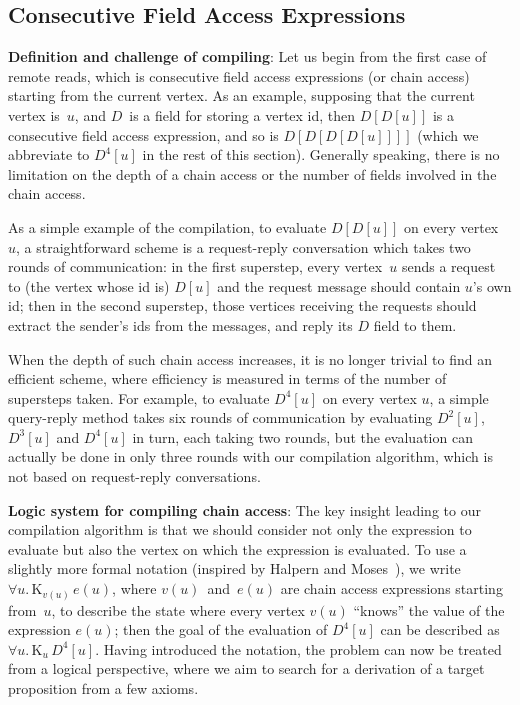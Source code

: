 \documentclass{sokendai_thesis} %
\newcommand{\knows}[2]{\mathrm K_{#1}\,{#2}}
\begin{document}
\subsection{Consecutive Field Access Expressions}
\label{sec:consecutive}

\textbf{Definition and challenge of compiling}:
Let us begin from the first case of remote reads, which is consecutive field access expressions (or chain access) starting from the current vertex.
As an example, supposing that the current vertex is~$u$, and $D$~is a field for storing a vertex id, then $D[D[u]]$ is a consecutive field access expression, and so is $D[D[D[D[u]]]]$ (which we abbreviate to $D^4[u]$ in the rest of this section).
Generally speaking, there is no limitation on the depth of a chain access or the number of fields involved in the chain access.

As a simple example of the compilation, to evaluate $D[D[u]]$ on every vertex~$u$, a straightforward scheme is a request-reply conversation which takes two rounds of communication:
in the first superstep, every vertex~$u$ sends a request to (the vertex whose id is) $D[u]$ and the request message should contain $u$'s own id;
then in the second superstep, those vertices receiving the requests should extract the sender's ids from the messages, and reply its $D$ field to them.

When the depth of such chain access increases, it is no longer trivial to find an efficient scheme, where efficiency is measured in terms of the number of supersteps taken.
For example, to evaluate $D^4[u]$ on every vertex $u$, a simple query-reply method takes six rounds of communication by evaluating $D^2[u]$, $D^3[u]$ and $D^4[u]$ in turn, each taking two rounds, but the evaluation can actually be done in only three rounds with our compilation algorithm, which is not based on request-reply conversations.

\textbf{Logic system for compiling chain access}:
The key insight leading to our compilation algorithm is that we should consider not only the expression to evaluate but also the vertex on which the expression is evaluated.
To use a slightly more formal notation (inspired by Halpern and Moses~\cite{Halpern-common-knowledge}), we write $\forall u.\,\knows{v(u)}{e(u)}$, where $v(u)$~and~$e(u)$ are chain access expressions starting from~$u$, to describe the state where every vertex $v(u)$ ``knows'' the value of the expression $e(u)$; then the goal of the evaluation of $D^4[u]$ can be described as $\forall u.\,\knows{u}{D^4[u]}$.
Having introduced the notation, the problem can now be treated from a logical perspective, where we aim to search for a derivation of a target proposition from a few axioms.
\end{document}

